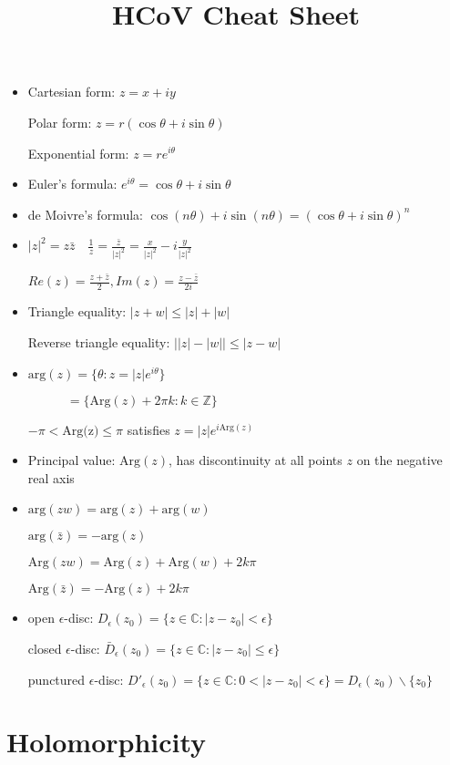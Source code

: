 \documentclass[10pt,a4paper]{article}
\title{HCoV Cheat Sheet}
\begin{document}
\begin{multicols}{2}


\begin{itemize}
    \item Cartesian form: $z=x+iy$
  
    Polar form: $z= r(\cos\theta+i\sin\theta)$
   
    Exponential form: $z=re^{i\theta}$
  \item Euler's formula: $e^{i\theta}=\cos\theta + i\sin\theta$
  \item de Moivre's formula: $\cos(n\theta) + i\sin(n\theta)=(\cos \theta + i \sin \theta)^n$
  \item $\displaystyle |z|^2= z \bar z \quad \frac{1}{z}= \frac{\bar z}{|z|^2}= \frac{x}{|z|^2}-i\frac{y}{|z|^2}$
   
    $\displaystyle Re(z)=\frac{z+\bar z}{2}, Im(z)=\frac{z-\bar z}{2i}$
  \item Triangle equality: $|z+w| \leq |z|+|w|$
   
    Reverse triangle equality: $\left| |z|-|w| \right| \leq |z-w|$
  \item $\text{arg}(z)=\{ \theta : z= |z|e^{i\theta} \}$ 
  
    $\qquad \quad= \{ \text{Arg}(z) + 2\pi k: k \in \mathbb Z \}$  
  
    $-\pi < \text{Arg(z)}\leq \pi$ satisfies $z=|z| e^{i \text{Arg}(z)}$
  
  \item  Principal value: $\text{Arg}(z)$, has discontinuity at all points $z$ on the negative real axis
  \item $\text{arg}(zw)=\text{arg}(z)+\text{arg}(w)$
        
        $\text{arg}(\bar z)=-\text{arg}(z)$
    
        $\text{Arg}(zw)=\text{Arg}(z)+\text{Arg}(w)+ 2k\pi$
        
        $\text{Arg}(\bar z)=-\text{Arg}(z) + 2k\pi$
  \item open $\epsilon$-disc: $D_\epsilon(z_0)=\{ z \in \mathbb C : |z-z_0| < \epsilon\}$
    
    closed $\epsilon$-disc: $\bar D_\epsilon(z_0)=\{ z \in \mathbb C : |z-z_0| \leq \epsilon\}$
    
    punctured $\epsilon$-disc: $D'_\epsilon(z_0)=\{ z \in \mathbb C : 0<|z-z_0| < \epsilon\} = D_\epsilon(z_0) \backslash \{ z_0 \}$
\end{itemize}

\section{Holomorphicity}


\end{multicols}
\end{document}
